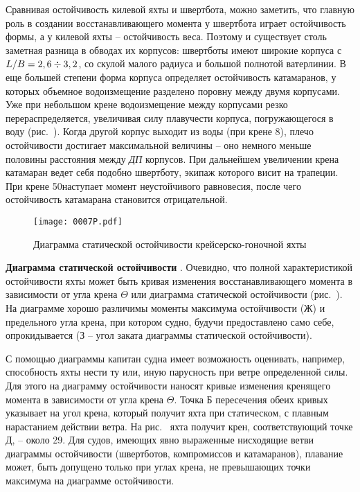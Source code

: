 Сравнивая остойчивость килевой яхты и швертбота, можно заметить, что
главную роль в создании восстанавливающего момента у швертбота играет
остойчивость формы, а у килевой яхты \--- остойчивость веса. Поэтому и
существует столь заметная разница в обводах их корпусов: швертботы
имеют широкие корпуса с $L/B = 2,6 \div 3,2$, со скулой малого
радиуса и большой полнотой ватерлинии. В еще большей степени форма
корпуса определяет остойчивость катамаранов, у которых объемное
водоизмещение разделено поровну между двумя корпусами. Уже при
небольшом крене водоизмещение между корпусами резко
перераспределяется, увеличивая силу плавучести корпуса, погружающегося
в воду (рис.~). Когда другой корпус выходит из воды (при крене
8\gr), плечо остойчивости достигает максимальной величины \---
оно немного меньше половины расстояния между \textit{ДП} корпусов. При
дальнейшем увеличении крена катамаран ведет себя подобно швертботу,
экипаж которого висит на трапеции. При крене 50\gr наступает
момент неустойчивого равновесия, после чего остойчивость катамарана
становится отрицательной.

\begin{figure*}[htb]
  \centering
  \texttt{[image: 0007P.pdf]}
  \caption{Диаграмма статической остойчивости крейсерско-гоночной яхты}
  \label{fig:7}
\end{figure*}

\textbf{Диаграмма статической остойчивости}
.
Очевидно, что полной характеристикой остойчивости
яхты может быть кривая изменения восстанавливающего момента
 в зависимости от угла крена $\Theta$ или диаграмма
статической остойчивости (рис.~). На диаграмме хорошо различимы
моменты максимума остойчивости (Ж) и предельного угла крена, при
котором судно, будучи предоставлено само себе, опрокидывается (З \---
угол заката диаграммы статической остойчивости).

С помощью диаграммы капитан судна имеет возможность оценивать,
например, способность яхты нести ту или, иную парусность при ветре
определенной силы. Для этого на диаграмму остойчивости наносят кривые
изменения кренящего момента  в зависимости от угла крена
$\Theta$. Точка Б пересечения обеих кривых указывает на угол крена,
который получит яхта при статическом, с плавным нарастанием действии
ветра. На рис.~ яхта получит крен, соответствующий точке Д,
\--- около 29\gr. Для судов, имеющих явно выраженные нисходящие ветви
диаграммы остойчивости (швертботов, компромиссов и катамаранов),
плавание может, быть допущено только при углах крена, не превышающих
точки максимума на диаграмме остойчивости.

